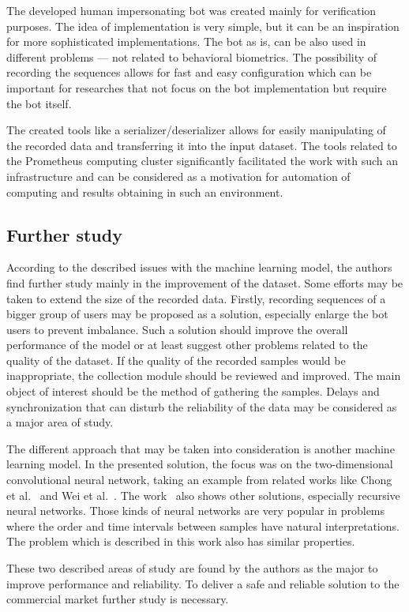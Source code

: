 The developed human impersonating bot was created mainly for verification purposes.
The idea of implementation is very simple, but it can be an inspiration for more sophisticated implementations.
The bot as is, can be also used in different problems --- not related to behavioral biometrics.
The possibility of recording the sequences allows for fast and easy configuration which can be important for researches that not focus on the bot implementation but require the bot itself.

The created tools like a serializer/deserializer allows for easily manipulating of the recorded data and transferring it into the input dataset.
The tools related to the Prometheus computing cluster significantly facilitated the work with such an infrastructure and can be considered as a motivation for automation of computing and results obtaining in such an environment.

\subsection{Further study}\label{subsec:further-study}
According to the described issues with the machine learning model, the authors find further study mainly in the improvement of the dataset.
Some efforts may be taken to extend the size of the recorded data.
Firstly, recording sequences of a bigger group of users may be proposed as a solution, especially enlarge the bot users to prevent imbalance.
Such a solution should improve the overall performance of the model or at least suggest other problems related to the quality of the dataset.
If the quality of the recorded samples would be inappropriate, the collection module should be reviewed and improved.
The main object of interest should be the method of gathering the samples.
Delays and synchronization that can disturb the reliability of the data may be considered as a major area of study.

The different approach that may be taken into consideration is another machine learning model.
In the presented solution, the focus was on the two-dimensional convolutional neural network, taking an example from related works like Chong et al.~\cite{Main} and Wei et al.~\cite{a-deep-learning-approach-to-web-bot-detection-using-mouse-behavioral-biometrics}.
The work~\cite{Main} also shows other solutions, especially recursive neural networks.
Those kinds of neural networks are very popular in problems where the order and time intervals between samples have natural interpretations.
The problem which is described in this work also has similar properties.

These two described areas of study are found by the authors as the major to improve performance and reliability.
To deliver a safe and reliable solution to the commercial market further study is necessary.

